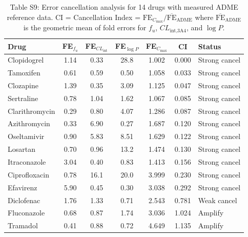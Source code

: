 \documentclass[review,3p]{elsarticle}
\begin{document}
\begin{table}[H]
\centering
\caption*{Table S9: Error cancellation analysis for 14 drugs with measured ADME reference data. CI = Cancellation Index = $\text{FE}_{C_{\max}} / \overline{\text{FE}}_{\text{ADME}}$ where $\overline{\text{FE}}_{\text{ADME}}$ is the geometric mean of fold errors for $f_u$, $CL_{\text{int,3A4}}$, and $\log P$.}
\small
\begin{tabular}{lcccccl}
\toprule
Drug & FE$_{f_u}$ & FE$_{CL_{\text{int}}}$ & FE$_{\log P}$ & FE$_{C_{\max}}$ & CI & Status \\
\midrule
Clopidogrel & 1.14 & 0.33 & 28.8 & 1.002 & 0.000 & Strong cancel \\
Tamoxifen & 0.61 & 0.59 & 0.50 & 1.058 & 0.033 & Strong cancel \\
Clozapine & 1.39 & 0.35 & 3.09 & 1.125 & 0.047 & Strong cancel \\
Sertraline & 0.78 & 1.04 & 1.62 & 1.067 & 0.085 & Strong cancel \\
Clarithromycin & 0.29 & 0.80 & 4.07 & 1.286 & 0.087 & Strong cancel \\
Azithromycin & 0.33 & 6.90 & 0.27 & 1.687 & 0.120 & Strong cancel \\
Oseltamivir & 0.90 & 5.83 & 8.51 & 1.629 & 0.122 & Strong cancel \\
Losartan & 0.70 & 0.96 & 13.2 & 1.474 & 0.130 & Strong cancel \\
Itraconazole & 3.04 & 0.40 & 0.83 & 1.413 & 0.156 & Strong cancel \\
Ciprofloxacin & 0.78 & 16.1 & 20.0 & 3.999 & 0.230 & Strong cancel \\
Efavirenz & 5.90 & 0.45 & 0.30 & 3.038 & 0.292 & Strong cancel \\
Diclofenac & 1.76 & 1.33 & 0.71 & 2.543 & 0.781 & Weak cancel \\
Fluconazole & 0.68 & 0.87 & 1.74 & 3.036 & 1.024 & Amplify \\
Tramadol & 0.41 & 0.88 & 0.72 & 4.649 & 1.135 & Amplify \\
\bottomrule
\end{tabular}
\end{table}
\end{document}

